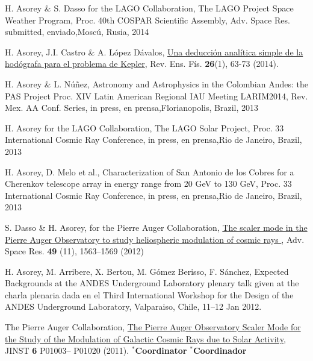 \begin{etaremune}
\item {}H. Asorey \& S. Dasso for the LAGO Collaboration, {{The LAGO Project Space Weather Program}}, \en Proc. 40th COSPAR Scientific Assembly, Adv. Space Res. \ifeng submitted, \else enviado,\fi  Moscú, Rusia, 2014

\item {}H. Asorey, J.I. Castro \& A. López Dávalos, \href{http://www.revistas.unc.edu.ar/index.php/revistaEF/article/view/9512}{{Una deducción analítica simple de la hodógrafa para el problema de Kepler}}, Rev. Ens. Fís. {\bf{26}}(1), 63-73 (2014).

\item {}H. Asorey \& L. Núñez, {{Astronomy and Astrophysics in the Colombian Andes: the PAS Project}} \en Proc. XIV Latin American Regional IAU Meeting LARIM2014, Rev. Mex. AA Conf. Series, \ifeng in press, \else en prensa,\fi  Florianopolis, Brazil, 2013

\item {}H. Asorey for the LAGO Collaboration, {{The LAGO Solar Project}}, \en Proc. 33 International Cosmic Ray Conference, \ifeng in press, \else en prensa,\fi  Rio de Janeiro, Brazil, 2013

\item {}H. Asorey, D. Melo {{et al.}}, {{Characterization of San Antonio de los Cobres for a Cherenkov telescope array in energy range from 20 GeV to 130 GeV}}, \en Proc. 33 International Cosmic Ray Conference, \ifeng in press, \else en prensa,\fi  Rio de Janeiro, Brazil, 2013

\item {}S. Dasso \& H. Asorey, for the Pierre Auger Collaboration,
\href{http://dx.doi.org/10.1016/j.asr.2011.12.028}{{ The scaler mode in
the Pierre Auger Observatory to study heliospheric modulation of cosmic rays
}}, Adv. Space Res. {\bf{49}} (11), 1563--1569 (2012)

\item {} H. Asorey, M. Arribere, X. Bertou, M. Gómez Berisso, F. Sánchez,
{{Expected Backgrounds at the ANDES Underground Laboratory}}
\ifeng
plenary talk given at the
\else 
charla plenaria dada en el
\fi
Third International Workshop for the Design of the ANDES Underground Laboratory, Valparaiso, Chile, 11--12 Jan 2012.

\item {}The Pierre Auger Collaboration,
\href{http://dx.doi.org/10.1088/1748-0221/6/01/P01003}{{The Pierre Auger
Observatory Scaler Mode for the Study of the Modulation of Galactic Cosmic Rays
due to Solar Activity}}, JINST {\bf 6} P01003--
P01020 (2011).
\ifeng $^*${\bf{Coordinator}} \else $^*${\bf{Coordinador}} \fi


\end{etaremune}
